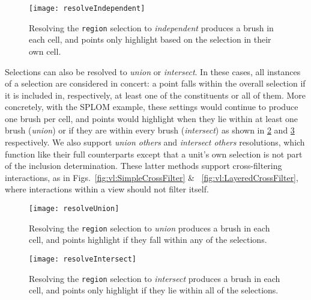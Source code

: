 \begin{figure}[h!]
  \centering
  \texttt{[image: resolveIndependent]}
  \caption{Resolving the \texttt{region} selection to \emph{independent}
produces a brush in each cell, and points only highlight based on the selection
in their own cell.}
  \label{fig:vl:resolveIndependent}
\end{figure}

Selections can also be resolved to \emph{union} or \emph{intersect}. In these
cases, all instances of a selection are considered in concert: a point falls
within the overall selection if it is included in, respectively, at least one of
the constituents or all of them. More concretely, with the SPLOM example, these
settings would continue to produce one brush per cell, and points would
highlight when they lie within at least one brush (\emph{union}) or if they are
within every brush (\emph{intersect}) as shown in \cref{fig:vl:resolveUnion} and
\cref{fig:vl:resolveIntersect} respectively. We also support \emph{union others}
and \emph{intersect others} resolutions, which function like their full
counterparts except that a unit's own selection is not part of the inclusion
determination. These latter methods support cross-filtering interactions, as in
Figs.~\ref{fig:vl:SimpleCrossFilter} \& ~\ref{fig:vl:LayeredCrossFilter}, where
interactions within a view should not filter itself.

\begin{figure}[h!]
  \centering
  \texttt{[image: resolveUnion]}
  \caption{Resolving the \texttt{region} selection to \emph{union}
produces a brush in each cell, and points highlight if they fall within any of
the selections.}
  \label{fig:vl:resolveUnion}
\end{figure}

\begin{figure}[h!]
  \centering
  \texttt{[image: resolveIntersect]}
  \caption{Resolving the \texttt{region} selection to \emph{intersect}
produces a brush in each cell, and points only highlight if they lie within all
of the selections.}
  \label{fig:vl:resolveIntersect}
\end{figure}